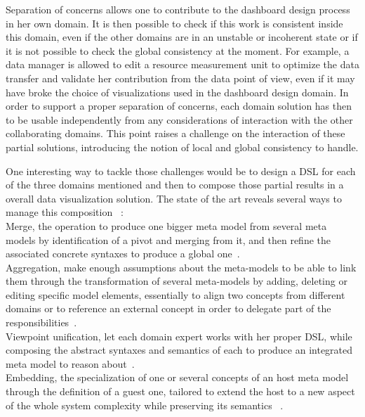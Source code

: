 \documentclass{sigplanconf}
\begin{document}
 Separation of concerns allows one to contribute to
the dashboard design process in her own domain. It is then possible to
check if this work is consistent inside this domain, even if the other
domains are in an unstable or incoherent state or if it is not
possible to check the global consistency at the moment. For example, a
data manager is allowed to edit a resource measurement unit to
optimize the data transfer and validate her contribution from the data
point of view, even if it may have broke the choice of visualizations
used in the dashboard design domain.  In order to support a proper
separation of concerns, each domain solution has then to be usable
independently from any considerations of interaction with the other
collaborating domains.  This point raises a challenge on the
interaction of these partial solutions, introducing the notion of
local and global consistency to handle.

  One interesting way to
tackle those challenges would be to design a DSL for each of the three
domains mentioned and then to compose those partial results in a
overall data visualization solution.
The state of the art reveals several ways to manage this composition ~\cite{emerson06}:\\
 Merge, \ie the operation to produce one bigger meta model
from several meta models by identification of a pivot and merging from
it, and then refine the associated concrete syntaxes to produce a global 
one~\cite{kienzle13}.\\
 Aggregation, \ie make enough assumptions about the
meta-models to be able to link them through the transformation of
several meta-models by adding, deleting or editing specific model
elements, essentially to align two concepts from different domains or
to reference an external concept
in order to delegate part of the responsibilities~\cite{blouin14}.\\
 Viewpoint unification, \ie let each domain expert works
with her proper DSL, while composing the abstract syntaxes
and semantics of each to produce an integrated meta model
to reason about~\cite{vallecillo10}.\\
 Embedding, \ie the specialization of one or several
concepts of an host meta model through the definition of a guest one,
tailored to extend the host to a new aspect of the whole system complexity
while preserving its semantics ~\cite{groenewegen2008webdsl}.
\end{document}

